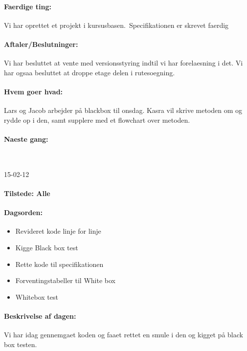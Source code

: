 \documentclass[a4paper,10pt,titlepage]{article}
\begin{document}
			\paragraph{Faerdige ting:}
			Vi har oprettet et projekt i kursusbasen.\
			Specifikationen er skrevet faerdig
			
			\paragraph{Aftaler/Beslutninger:}
			Vi har besluttet at vente med versionsstyring indtil vi har forelaesning i det. Vi har ogsaa besluttet at droppe etage delen i rutesoegning. 
			
			\paragraph{Hvem goer hvad:}
			Lars og Jacob arbejder på blackbox til onsdag. Kasra vil skrive metoden om og rydde op i den, samt supplere med et flowchart over metoden.
			\paragraph{Naeste gang:}\mbox{}\\
			
			\begin{center}
		15-02-12
		\end{center}
				\paragraph{Tilstede: Alle}
				\paragraph{Dagsorden:}
				\begin{itemize}
					\item Revideret kode linje for linje
					\item Kigge Black box test
					\item Rette kode til specifikationen
					\item Forventingstabeller til White box
					\item Whitebox test
				\end{itemize}
				
			\paragraph{Beskrivelse af dagen:}
			Vi har idag gennemgaet koden og faaet rettet en smule i den og kigget på black box testen.
			
\end{document}
